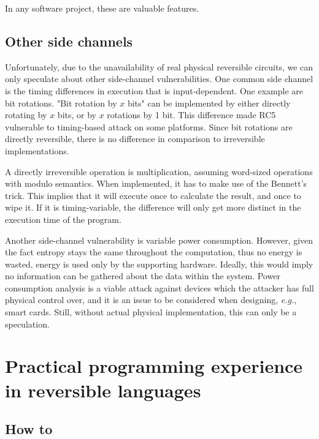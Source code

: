 \documentclass[a4paper,10pt,openright]{memoir}
\newcommand{\eg}{\emph{e.g.}\xspace}
\begin{document}
In any software project, these are valuable features.

\section{Other side channels}


Unfortunately, due to the unavailability of real physical reversible 
circuits, we can only speculate about other side-channel 
vulnerabilities. One common side channel is the timing differences in 
execution that is input-dependent. One example are bit rotations. "Bit 
rotation by $x$ bits" can be implemented by either directly rotating by 
$x$ bits, or by $x$ rotations by 1 bit. This difference made RC5 
vulnerable to timing-based attack on some platforms\cite{TimingRC5}. 
Since bit rotations are directly reversible, there is no difference in 
comparison to irreversible implementations.

A directly irreversible operation is multiplication, assuming 
word-sized operations with modulo semantics. When implemented, it has 
to make use of the Bennett's trick. This implies that it will execute 
once to calculate the result, and once to wipe it. If it is 
timing-variable, the difference will only get more distinct in the 
execution time of the program.

Another side-channel vulnerability is variable power consumption. 
However, given the fact entropy stays the same throughout the 
computation, thus no energy is wasted, energy is used only by the 
supporting hardware. Ideally, this would imply no information can be 
gathered about the data within the system. Power consumption analysis 
is a viable attack against devices which the attacker has full physical 
control over, and it is an issue to be considered when designing, \eg, 
smart cards. Still, without actual physical implementation, this can 
only be a speculation. 

\chapter{Practical programming experience in reversible languages}

\section{How to}
\end{document}
